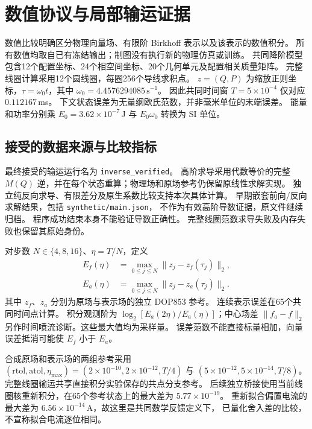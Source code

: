 \section{数值协议与局部输运证据}
\label{sec:numerical}

数值比较明确区分物理向量场、有限阶 Birkhoff 表示以及该表示的数值积分。
所有数值均取自已有冻结输出；制图没有执行新的物理仿真或训练。
共同降阶模型包含12个配置坐标、24个相空间坐标、20个几何单元及配置相关质量矩阵。
完整线圈计算采用12个圆线圈，每圈256个导线求积点。
$z=(Q,P)$ 为缩放正则坐标，$\tau=\omega_0t$，其中
$\omega_0=4.4576294085\,\mathrm{s}^{-1}$。
因此共同时间窗 $T=5\times10^{-4}$ 仅对应 $0.112167$\,ms。
下文状态误差为无量纲欧氏范数，并非毫米单位的末端误差。
能量和功率分别乘 $E_0=3.62\times10^{-7}$\,J 与 $E_0\omega_0$ 转换为 SI 单位。

\subsection{接受的数据来源与比较指标}

最终接受的输运运行名为 \texttt{inverse\_verified}。
高阶求导采用代数等价的完整 $M(Q)$ 逆，并在每个状态重算；物理场和原场参考仍保留原线性求解实现。
独立纯反向求导、有限差分及原生系数比较支持本次具体计算。
早期嵌套前向/反向求解结果，包括 \texttt{synthetic/main.json}，
不作为有效高阶导数证据，原文件继续归档。
程序成功结束本身不能验证导数正确性。
完整线圈范数求导失败及内存失败也保留其原始身份。

对步数 $N\in\{4,8,16\}$、$\eta=T/N$，定义
\begin{equation}
 \begin{aligned}
 E_f(\eta)&=\max_{0\leq j\leq N}\|z_j-z_f(\tau_j)\|_2,\\
 E_a(\eta)&=\max_{0\leq j\leq N}\|z_j-z_a(\tau_j)\|_2.
 \end{aligned}
 \label{eq:numerical-errors}
\end{equation}
其中 $z_f$、$z_a$ 分别为原场与表示场的独立 DOP853 参考。
连续表示误差在65个共同时间点计算。
积分观测阶为 $\log_2[E_a(2\eta)/E_a(\eta)]$；中心场差 $\|f_a-f\|_2$
另作时间喷流诊断。这些最大值均为采样量。
误差范数不能直接标量相加，向量误差抵消可能使 $E_f$ 小于 $E_a$。

合成原场和表示场的两组参考采用
$(\mathrm{rtol},\mathrm{atol},\eta_{\max})=(2\times10^{-10},2\times10^{-12},T/4)$
与 $(5\times10^{-12},5\times10^{-14},T/8)$。
完整线圈输运共享直接积分实验保存的共点分支参考。
后续独立桥接使用当前线圈核重新积分，在65个参考状态上的最大差为 $5.77\times10^{-19}$。
重新拟合偏置电流的最大差为 $6.56\times10^{-14}$\,A，故这里是共同数学反馈定义下，
已量化舍入差的比较，不宣称拟合电流逐位相同。

